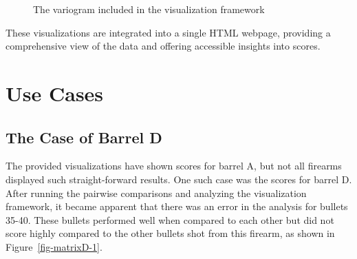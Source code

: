 \documentclass[
  number,
  preprint,
  5p,
  twocolumn]{elsarticle}
\begin{document}
\begin{figure}


\caption{\label{fig-variogramA}The variogram included in the
visualization framework}

\end{figure}%

These visualizations are integrated into a single HTML webpage,
providing a comprehensive view of the data and offering accessible
insights into scores.

\section{Use Cases}\label{use-cases}

\subsection{The Case of Barrel D}\label{the-case-of-barrel-d}

The provided visualizations have shown scores for barrel A, but not all
firearms displayed such straight-forward results. One such case was the
scores for barrel D. After running the pairwise comparisons and
analyzing the visualization framework, it became apparent that there was
an error in the analysis for bullets 35-40. These bullets performed well
when compared to each other but did not score highly compared to the
other bullets shot from this firearm, as shown in
Figure~\ref{fig-matrixD-1}.
\end{document}
